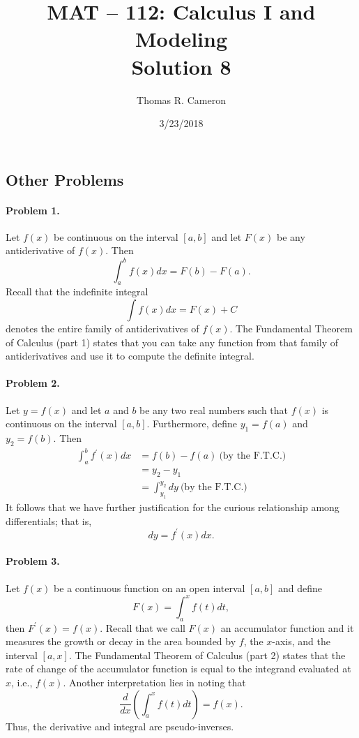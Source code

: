 \documentclass{article}
\title{MAT -- 112: Calculus I and Modeling\\
\large{Solution 8}}
\author{Thomas R. Cameron}
\date{3/23/2018}
\begin{document}
\maketitle

\subsection*{Other Problems}

\paragraph*{Problem 1.} Let $f(x)$ be continuous on the interval $[a,b]$ and let $F(x)$ be any antiderivative of $f(x)$. Then
\[
\int_{a}^{b}f(x)dx=F(b)-F(a).
\]
Recall that the indefinite integral
\[
\int f(x)dx=F(x)+C
\]
denotes the entire family of antiderivatives of $f(x)$. The Fundamental Theorem of Calculus (part 1) states that you can take any function from that family of antiderivatives and use it to compute the definite integral. 

\paragraph*{Problem 2.} Let $y=f(x)$ and let $a$ and $b$ be any two real numbers such that $f(x)$ is continuous on the interval $[a,b]$. Furthermore, define $y_{1}=f(a)$ and $y_{2}=f(b)$. Then
\begin{align*}
\int_{a}^{b}f^{'}(x)dx&=f(b)-f(a)~\text{(by the F.T.C.)} \\
&=y_{2}-y_{1} \\
&=\int_{y_{1}}^{y_{2}}dy~\text{(by the F.T.C.)}
\end{align*}
It follows that we have further justification for the curious relationship among differentials; that is,
\[
dy = f^{'}(x)dx.
\]

\paragraph*{Problem 3.} Let $f(x)$ be a continuous function on an open interval $[a,b]$ and define
\[
F(x)=\int_{a}^{x}f(t)dt,
\]
then $F^{'}(x)=f(x)$. Recall that we call $F(x)$ an accumulator function and it measures the growth or decay in the area bounded by $f$, the $x$-axis, and the interval $[a,x]$. The Fundamental Theorem of Calculus (part 2) states that the rate of change of the accumulator function is equal to the integrand evaluated at $x$, i.e., $f(x)$. Another interpretation lies in noting that
\[
\frac{d}{dx}\left(\int_{a}^{x}f(t)dt\right)=f(x).
\]
Thus, the derivative and integral are pseudo-inverses. 
\end{document}
